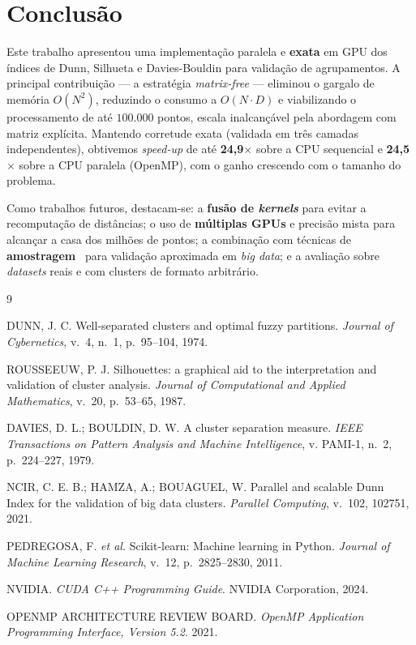 \documentclass[12pt]{article}
\begin{document}
\section{Conclusão}

Este trabalho apresentou uma implementação paralela e \textbf{exata} em GPU
dos índices de Dunn, Silhueta e Davies-Bouldin para validação de
agrupamentos. A principal contribuição --- a estratégia \emph{matrix-free}
--- eliminou o gargalo de memória $O(N^2)$, reduzindo o consumo a
$O(N\cdot D)$ e viabilizando o processamento de até $100.000$ pontos, escala
inalcançável pela abordagem com matriz explícita. Mantendo corretude exata
(validada em três camadas independentes), obtivemos \emph{speed-up} de até
\textbf{24,9$\times$} sobre a CPU sequencial e \textbf{24,5$\times$} sobre a
CPU paralela (OpenMP), com o ganho crescendo com o tamanho do problema.

Como trabalhos futuros, destacam-se: a \textbf{fusão de \emph{kernels}} para
evitar a recomputação de distâncias; o uso de \textbf{múltiplas GPUs} e
precisão mista para alcançar a casa dos milhões de pontos; a combinação com
técnicas de \textbf{amostragem}~\cite{ncir2021} para validação aproximada em
\emph{big data}; e a avaliação sobre \emph{datasets} reais e com clusters de
formato arbitrário.

\begin{thebibliography}{9}

DUNN, J. C.
\newblock Well-separated clusters and optimal fuzzy partitions.
\newblock \emph{Journal of Cybernetics}, v.~4, n.~1, p.~95--104, 1974.

ROUSSEEUW, P. J.
\newblock Silhouettes: a graphical aid to the interpretation and validation
of cluster analysis.
\newblock \emph{Journal of Computational and Applied Mathematics}, v.~20,
p.~53--65, 1987.

DAVIES, D. L.; BOULDIN, D. W.
\newblock A cluster separation measure.
\newblock \emph{IEEE Transactions on Pattern Analysis and Machine
Intelligence}, v. PAMI-1, n.~2, p.~224--227, 1979.

NCIR, C. E. B.; HAMZA, A.; BOUAGUEL, W.
\newblock Parallel and scalable Dunn Index for the validation of big data
clusters.
\newblock \emph{Parallel Computing}, v.~102, 102751, 2021.

PEDREGOSA, F. \emph{et al.}
\newblock Scikit-learn: Machine learning in Python.
\newblock \emph{Journal of Machine Learning Research}, v.~12, p.~2825--2830,
2011.

NVIDIA.
\newblock \emph{CUDA C++ Programming Guide}.
\newblock NVIDIA Corporation, 2024.

OPENMP ARCHITECTURE REVIEW BOARD.
\newblock \emph{OpenMP Application Programming Interface, Version 5.2}. 2021.

\end{thebibliography}
\end{document}
